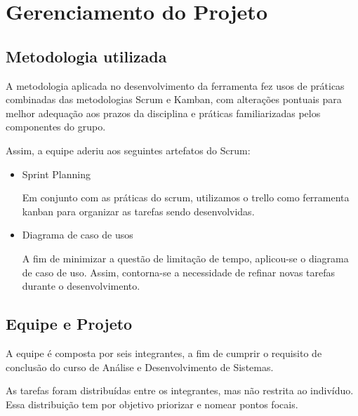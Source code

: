 \chapter{Gerenciamento do Projeto}

	\section{Metodologia utilizada}
		
		A metodologia aplicada no desenvolvimento da ferramenta fez usos de práticas combinadas das metodologias Scrum e Kamban, com alterações pontuais para melhor adequação aos prazos da disciplina e práticas familiarizadas pelos componentes do grupo.

		Assim, a equipe aderiu aos seguintes artefatos do Scrum:

		\begin{itemize}
			\item 
				Sprint Planning

				Em conjunto com as práticas do scrum, utilizamos o trello como ferramenta kanban para organizar as tarefas sendo desenvolvidas.

			\item 
				Diagrama de caso de usos
				
				A fim de minimizar a questão de limitação de tempo, aplicou-se o diagrama de caso de uso. Assim, contorna-se a necessidade de refinar novas tarefas durante o desenvolvimento.

		\end{itemize}
		
	\section{Equipe e Projeto}

		A equipe é composta por seis integrantes, a fim de cumprir o requisito de conclusão do curso de Análise e Desenvolvimento de Sistemas.

		As tarefas foram distribuídas entre os integrantes, mas não restrita ao indivíduo. Essa distribuição tem por objetivo priorizar e nomear pontos focais.
		
